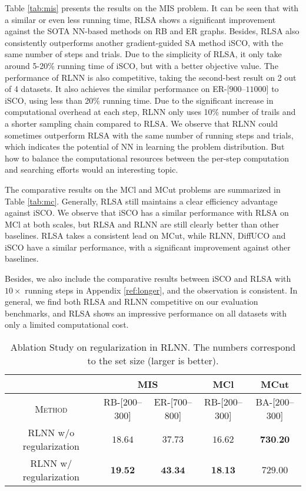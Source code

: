Table \ref{tab:mis} presents the results on the MIS problem. It can be seen that with a similar or even less running time, RLSA shows a significant improvement against the SOTA NN-based methods on RB and ER graphs. Besides, RLSA also consistently outperforms another gradient-guided SA method iSCO, with the same number of steps and trials. Due to the simplicity of RLSA, it only take around  5-20\% running time of iSCO, but with a better objective value. The performance of RLNN is also competitive, taking the second-best result on 2 out of 4 datasets. It also achieves the similar performance on ER-[$900$--$11000$] to iSCO, using less than 20\% running time. Due to the significant increase in computational overhead at each step, RLNN only uses 10\% number of trails and a shorter sampling chain compared to RLSA. We observe that RLNN could sometimes outperform RLSA with the same number of running steps and trials, which indicates the potential of NN in learning the problem distribution. But how to balance the computational resources between the per-step computation and searching efforts would an interesting topic.

The comparative results on the MCl and MCut problems are summarized in Table \ref{tab:mc}. Generally, RLSA still maintains a clear efficiency advantage against iSCO.  We observe that iSCO has a similar performance with RLSA on MCl at both scales, but RLSA and RLNN are still clearly better than other baselines. RLSA takes a consistent lead on MCut, while RLNN, DiffUCO and iSCO have a similar performance, with a significant improvement against other baselines. 

Besides, we also include the comparative results between iSCO and RLSA with $10\times$ running steps in Appendix \ref{ref:longer}, and the observation is consistent. In general, we find both RLSA and RLNN competitive on our evaluation benchmarks, and RLSA shows an impressive performance on all datasets with only a limited computational cost.

\begin{table*}[ht!]
\small
    \centering
        \caption{Ablation Study on regularization in RLNN. The numbers correspond to the set size (larger is better).}
            \vspace{5pt}
    \begin{tabular}{c|cc|c|c}

    & \multicolumn{2}{c|}{\textbf{MIS}}& \textbf{MCl} & \textbf{MCut} \\
        \toprule
    \textsc{Method} & RB-[$200$--$300$] &  ER-[$700$--$800$]  & RB-[$200$--$300$]   & BA-[$200$--$300$]  \\
    \midrule
     RLNN w/o regularization & $18.64$    & $37.73$  & $16.62$ & $\textbf{730.20}$ \\
    RLNN w/ regularization & $\textbf{19.52}$  & 
$\textbf{43.34}$ & $\textbf{18.13}$ & $729.00$\\
    \bottomrule
    \end{tabular}

    \label{tab:ablate}
\end{table*}
